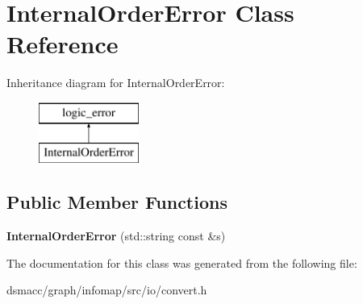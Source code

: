\hypertarget{classInternalOrderError}{}\section{Internal\+Order\+Error Class Reference}
\label{classInternalOrderError}
Inheritance diagram for Internal\+Order\+Error\+:\begin{figure}[H]
\begin{center}
\leavevmode
\includegraphics[height=2.000000cm]{classInternalOrderError}
\end{center}
\end{figure}
\subsection*{Public Member Functions}
\begin{DoxyCompactItemize}
\item 
\mbox{\label{classInternalOrderError_a9ee0030d1325d85a4444fd85d307b2f4}} 
{\bfseries Internal\+Order\+Error} (std\+::string const \&s)
\end{DoxyCompactItemize}


The documentation for this class was generated from the following file\+:\begin{DoxyCompactItemize}
\item 
dsmacc/graph/infomap/src/io/convert.\+h\end{DoxyCompactItemize}
